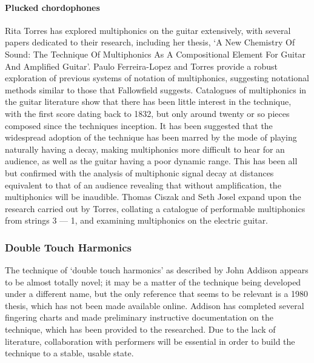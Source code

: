 \paragraph{Plucked chordophones}
Rita Torres has explored multiphonics on the guitar extensively, with several papers dedicated to their research, including her thesis, `A New Chemistry Of Sound: The Technique Of Multiphonics As A Compositional Element For Guitar And Amplified Guitar'.\autocite{torresMultiphonicsCompositionalElement2012}
Paulo Ferreira-Lopez and Torres provide a robust exploration of previous systems of notation of multiphonics, suggesting notational methods similar to those that Fallowfield suggests.\autocite{ferreira-lopesGuitarMultiphonicsNotations}
Catalogues of multiphonics in the guitar literature show that there has been little interest in the technique, with the first score dating back to 1832, but only around twenty or so pieces composed since the techniques inception.\autocite[80--82]{torresSoundWorldGuitar2018}
It has been suggested that the widespread adoption of the technique has been marred by the mode of playing naturally having a decay, making multiphonics more difficult to hear for an audience, as well as the guitar having a poor dynamic range.\autocite[21--22]{Torres2014TowardsOT}
This has been all but confirmed with the analysis of multiphonic signal decay at distances equivalent to that of an audience revealing that without amplification, the multiphonics will be inaudible.\autocite[279]{torresGuitarMultiphonicsInfluence2014}
Thomas Ciszak and Seth Josel expand upon the research carried out by Torres, collating a catalogue of performable multiphonics from strings 3 --- 1, and examining multiphonics on the electric guitar.\autocite{ciszakNeonLightMultiphonic2020}

\subsubsection{Double Touch Harmonics}
The technique of `double touch harmonics' as described by John Addison appears to be almost totally novel; it may be a matter of the technique being developed under a different name, but the only reference that seems to be relevant is a 1980 thesis, which has not been made available online.\autocite{woodrichMultinodalPerformanceTechnique1980}
Addison has completed several fingering charts and made preliminary instructive documentation on the technique, which has been provided to the researched.
Due to the lack of literature, collaboration with performers will be essential in order to build the technique to a stable, usable state.